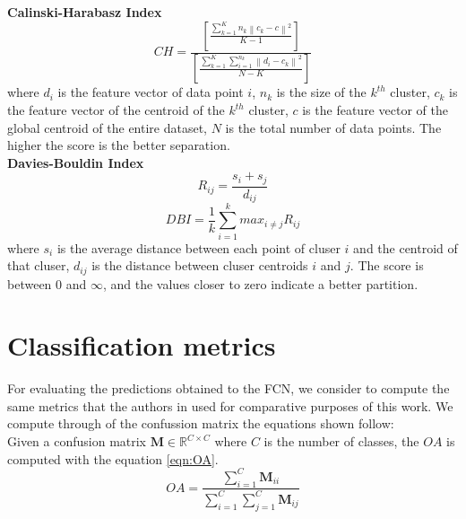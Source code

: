 \documentclass[journal,article,submit,pdftex,moreauthors]{Definitions/mdpi}
\begin{document}
\textbf{Calinski-Harabasz Index}
    \begin{equation}
        CH=\frac{\left[\frac{\sum_{k=1}^{K} n_{k}\left\|c_{k}-c\right\|^{2}}{K-1}\right]}{\left[\frac{\sum_{k=1}^{K} \sum_{i=1}^{n_{k}}\left\|d_{i}-c_{k}\right\|^{2}}{N-K}\right]}
    \end{equation}
    where $d_i$ is the feature vector of data point $i$, $n_k$ is the size of the $k^{th}$ cluster, $c_k$ is the feature vector of the centroid of the $k^{th}$ cluster, $c$ is the feature vector of the global centroid of the entire dataset, $N$ is the total number of data points. The higher the score is the better separation.\\

\textbf{Davies-Bouldin Index}
    \begin{equation}
        R_{ij} = \frac{s_{i} + s_{j}}{d_{ij}}
    \end{equation}
    \begin{equation}
        DBI = \frac{1}{k} \sum_{i=1}^{k} max_{i \neq j} R_{ij}
    \end{equation}
    where $s_{i}$ is the average distance between each point of cluser $i$ and the centroid of that cluser, $d_{ij}$ is the distance between cluser centroids $i$ and $j$. The score is between $0$ and $\infty$, and the values closer to zero indicate a better partition.\\

\section[\appendixname~\thesection]{Classification metrics}\label{distance_m} 
For evaluating the predictions obtained to the FCN, we consider to compute the same metrics that the authors in \cite{Russwurm2020} used for comparative purposes of this work. We compute through of the confussion matrix the equations shown follow:\\

Given a confusion matrix $\mathbf{M} \in \mathbb{R}^{C \times C}$ where $C$ is the number of classes, the $OA$ is computed with the equation \ref{eqn:OA}.
\begin{equation}
	\label{eqn:OA}
	OA = \frac{\sum_{i=1}^{C} \mathbf{M}_{ii}}{\sum_{i=1}^{C} \sum_{j=1}^{C} \mathbf{M}_{ij}}
\end{equation}
\end{document}
